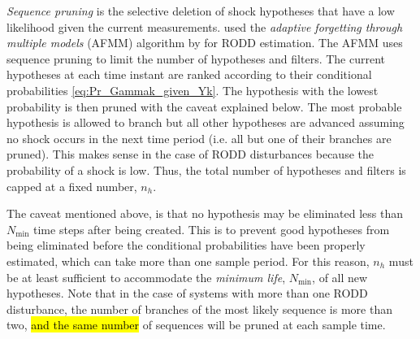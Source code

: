 {\textit{Sequence pruning} is the selective deletion of shock hypotheses that have a low likelihood given the current measurements. \cite{eriksson_classification_1996} used the \textit{adaptive forgetting through multiple models} (\acrshort{AFMM}) algorithm by \cite{andersson_adaptive_1985} for \gls{RODD} estimation. The \gls{AFMM} uses sequence pruning to limit the number of hypotheses and filters. The current hypotheses at each time instant are ranked according to their conditional probabilities \eqref{eq:Pr_Gammak_given_Yk}. The hypothesis with the lowest probability is then pruned with the caveat explained below. The most probable hypothesis is allowed to branch but all other hypotheses are advanced assuming no shock occurs in the next time period (i.e. all but one of their branches are pruned). This makes sense in the case of \gls{RODD} disturbances because the probability of a shock is low. Thus, the total number of hypotheses and filters is capped at a fixed number, $n_h$.

The caveat mentioned above, is that no hypothesis may be eliminated less than $N_\text{min}$ time steps after being created. This is to prevent good hypotheses from being eliminated before the conditional probabilities have been properly estimated, which can take more than one sample period. For this reason, $n_h$ must be at least sufficient to accommodate the \textit{minimum life}, $N_\text{min}$, of all new hypotheses. Note that in the case of systems with more than one \gls{RODD} disturbance, the number of branches of the most likely sequence is more than two, \hl{and the same number} of sequences will be pruned at each sample time.
%

}
